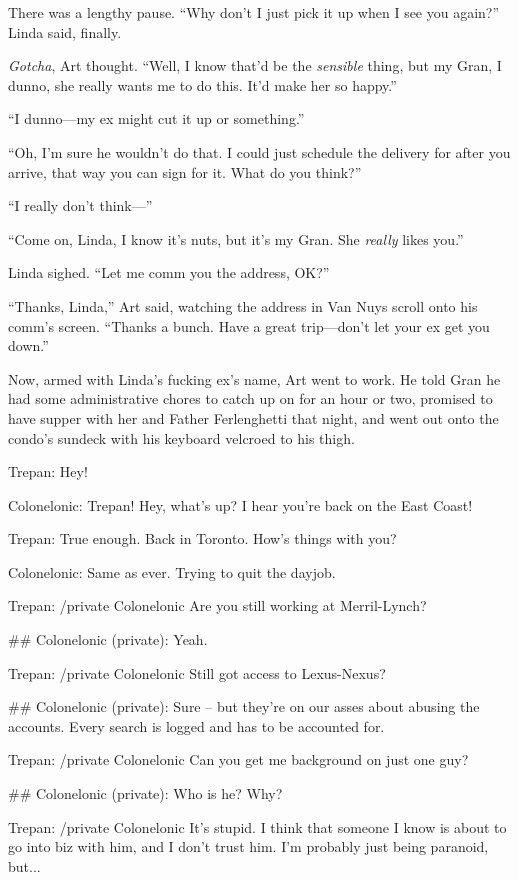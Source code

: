 There was a lengthy pause. “Why don’t I just pick it up when I see
you again?” Linda said, finally.

\emph{Gotcha}, Art thought. “Well, I know that’d be the
\emph{sensible} thing, but my Gran, I dunno, she really wants me to
do this. It’d make her so happy.”

“I dunno—my ex might cut it up or something.”

“Oh, I’m sure he wouldn’t do that. I could just schedule the
delivery for after you arrive, that way you can sign for it. What
do you think?”

“I really don’t think—”

“Come on, Linda, I know it’s nuts, but it’s my Gran. She
\emph{really} likes you.”

Linda sighed. “Let me comm you the address, OK?”

“Thanks, Linda,” Art said, watching the address in Van Nuys scroll
onto his comm’s screen. “Thanks a bunch. Have a great trip—don’t
let your ex get you down.”

Now, armed with Linda’s fucking ex’s name, Art went to work. He
told Gran he had some administrative chores to catch up on for an
hour or two, promised to have supper with her and Father
Ferlenghetti that night, and went out onto the condo’s sundeck with
his keyboard velcroed to his thigh.

Trepan: Hey!

Colonelonic: Trepan! Hey, what's up? I hear you're back on the East
Coast!

Trepan: True enough. Back in Toronto. How's things with you?

Colonelonic: Same as ever. Trying to quit the dayjob.

Trepan: /private Colonelonic Are you still working at
Merril-Lynch?

\#\# Colonelonic (private): Yeah.

Trepan: /private Colonelonic Still got access to Lexus-Nexus?

\#\# Colonelonic (private): Sure -- but they're on our asses about
abusing the accounts. Every search is logged and has to be
accounted for.

Trepan: /private Colonelonic Can you get me background on just one
guy?

\#\# Colonelonic (private): Who is he? Why?

Trepan: /private Colonelonic It's stupid. I think that someone I
know is about to go into biz with him, and I don't trust him. I'm
probably just being paranoid, but...

